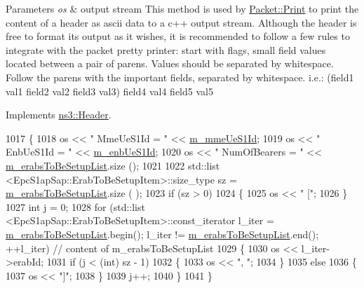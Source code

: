 \begin{DoxyParams}{Parameters}
{\em os} & output stream This method is used by \hyperlink{classns3_1_1Packet_aa34058a5cdbf94673531f8c4001ab227}{Packet\+::\+Print} to print the content of a header as ascii data to a c++ output stream. Although the header is free to format its output as it wishes, it is recommended to follow a few rules to integrate with the packet pretty printer\+: start with flags, small field values located between a pair of parens. Values should be separated by whitespace. Follow the parens with the important fields, separated by whitespace. i.\+e.\+: (field1 val1 field2 val2 field3 val3) field4 val4 field5 val5 \\
\hline
\end{DoxyParams}


Implements \hyperlink{classns3_1_1Header_a2ce1df7579b2ade7bc7302357feac77a}{ns3\+::\+Header}.


\begin{DoxyCode}
1017 \{
1018   os << \textcolor{stringliteral}{" MmeUeS1Id = "} << \hyperlink{classns3_1_1EpcS1APInitialContextSetupRequestHeader_a6a9fdc8227eeed2cd24dfda32418c260}{m\_mmeUeS1Id};
1019   os << \textcolor{stringliteral}{" EnbUeS1Id = "} << \hyperlink{classns3_1_1EpcS1APInitialContextSetupRequestHeader_a37f5cdab600c58a26abb754ad2593898}{m\_enbUeS1Id};
1020   os << \textcolor{stringliteral}{" NumOfBearers = "} << \hyperlink{classns3_1_1EpcS1APInitialContextSetupRequestHeader_a8119746e508311886cc8503a52dca315}{m\_erabsToBeSetupList}.size ();
1021 
1022   std::list <EpcS1apSap::ErabToBeSetupItem>::size\_type sz = \hyperlink{classns3_1_1EpcS1APInitialContextSetupRequestHeader_a8119746e508311886cc8503a52dca315}{m\_erabsToBeSetupList}.size (
      );
1023   \textcolor{keywordflow}{if} (sz > 0)
1024     \{
1025       os << \textcolor{stringliteral}{" ["};
1026     \}
1027   \textcolor{keywordtype}{int} j = 0;  
1028   \textcolor{keywordflow}{for} (std::list <EpcS1apSap::ErabToBeSetupItem>::const\_iterator l\_iter = 
      \hyperlink{classns3_1_1EpcS1APInitialContextSetupRequestHeader_a8119746e508311886cc8503a52dca315}{m\_erabsToBeSetupList}.begin(); l\_iter != \hyperlink{classns3_1_1EpcS1APInitialContextSetupRequestHeader_a8119746e508311886cc8503a52dca315}{m\_erabsToBeSetupList}.end();
       ++l\_iter) \textcolor{comment}{// content of m\_erabsToBeSetupList}
1029   \{
1030     os << l\_iter->erabId;
1031     \textcolor{keywordflow}{if} (j < (\textcolor{keywordtype}{int}) sz - 1)
1032       \{
1033         os << \textcolor{stringliteral}{", "};
1034       \}
1035     \textcolor{keywordflow}{else}
1036       \{
1037         os << \textcolor{stringliteral}{"]"};
1038       \}
1039     j++;  
1040   \}
1041 \}
\end{DoxyCode}
